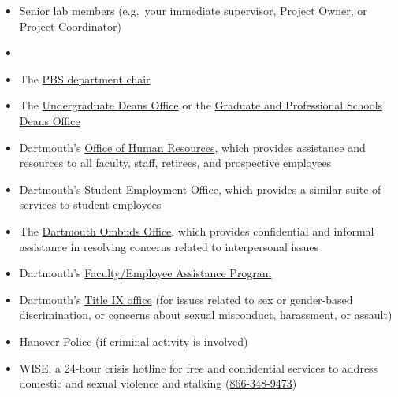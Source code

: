 \documentclass{tufte-book} %
\begin{document}
\begin{itemize}
\item Senior lab members (e.g.\ your immediate supervisor, Project
  Owner, or Project Coordinator)

\item \director

\item The \href{https://pbs.dartmouth.edu/people}{PBS department chair}

\item The
  \href{https://undergraduate-deans.dartmouth.edu/}{Undergraduate
    Deans Office} or the
  \href{mailto:Graduate.and.Advanced.Studies@Dartmouth.edu}{Graduate
    and Professional Schools Deans Office}

\item Dartmouth's \href{https://www.dartmouth.edu/hr/}{Office of
    Human Resources}, which provides assistance and resources to all
  faculty, staff, retirees, and prospective employees

\item Dartmouth's
  \href{https://www.dartmouth.edu/hr/employment/student_employment/index.php}{Student
    Employment Office}, which provides a similar suite of services to
  student employees

\item The \href{https://sites.dartmouth.edu/ombuds/}{Dartmouth Ombuds
    Office}, which provides confidential and informal assistance in
  resolving concerns related to interpersonal issues

\item Dartmouth's
  \href{https://www.dartmouth.edu/~eap/}{Faculty/Employee Assistance
    Program}

\item Dartmouth's
  \href{https://eoatix.dartmouth.edu/support-services/sexual-respect-and-title-ix}{Title
    IX office} (for issues related to sex or gender-based
  discrimination, or concerns about sexual misconduct, harassment, or
  assault)

\item
  \href{https://www.hanovernh.org/265/Police-Department}{Hanover
    Police} (if criminal activity is involved)

\item WISE, a 24-hour crisis hotline for free and confidential
  services to address domestic and sexual violence and stalking
  (\href{tel:18663489473}{866-348-9473})

\end{itemize}
\end{document}
